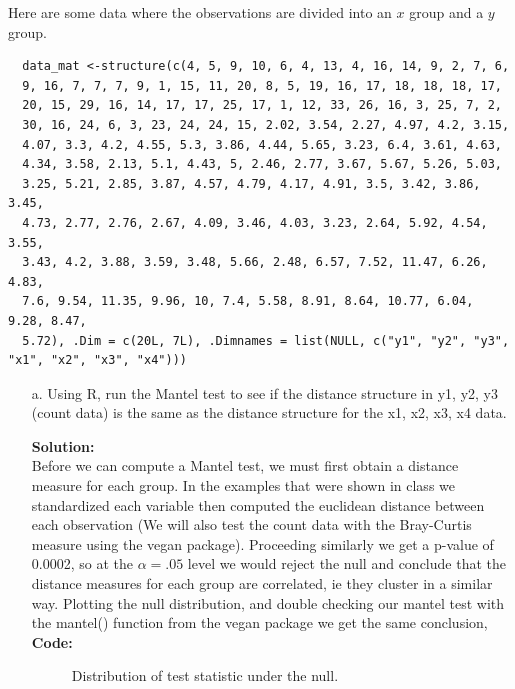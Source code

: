\documentclass[12pt]{article}
\makeatletter
\theoremstyle{homework}
\newenvironment{exercise}[1]
{\def\@currentlabel{#1}\exercisecore}
{\endexercisecore}
\newcommand{\localhead}[1]{\par\smallskip\noindent\textbf{#1}\nobreak\\}%
\newcommand\solution{\localhead{Solution:}}
\makeatother
\begin{document}
\begin{exercise}{1} Here are some data where the observations are divided into an $x$ group and a $y$ group. 
  \begin{footnotesize}
  \begin{verbatim}
  data_mat <-structure(c(4, 5, 9, 10, 6, 4, 13, 4, 16, 14, 9, 2, 7, 6,
  9, 16, 7, 7, 7, 9, 1, 15, 11, 20, 8, 5, 19, 16, 17, 18, 18, 18, 17,
  20, 15, 29, 16, 14, 17, 17, 25, 17, 1, 12, 33, 26, 16, 3, 25, 7, 2,
  30, 16, 24, 6, 3, 23, 24, 24, 15, 2.02, 3.54, 2.27, 4.97, 4.2, 3.15,
  4.07, 3.3, 4.2, 4.55, 5.3, 3.86, 4.44, 5.65, 3.23, 6.4, 3.61, 4.63,
  4.34, 3.58, 2.13, 5.1, 4.43, 5, 2.46, 2.77, 3.67, 5.67, 5.26, 5.03,
  3.25, 5.21, 2.85, 3.87, 4.57, 4.79, 4.17, 4.91, 3.5, 3.42, 3.86, 3.45,
  4.73, 2.77, 2.76, 2.67, 4.09, 3.46, 4.03, 3.23, 2.64, 5.92, 4.54, 3.55,
  3.43, 4.2, 3.88, 3.59, 3.48, 5.66, 2.48, 6.57, 7.52, 11.47, 6.26, 4.83,
  7.6, 9.54, 11.35, 9.96, 10, 7.4, 5.58, 8.91, 8.64, 10.77, 6.04, 9.28, 8.47,
  5.72), .Dim = c(20L, 7L), .Dimnames = list(NULL, c("y1", "y2", "y3", "x1", "x2", "x3", "x4")))
  \end{verbatim}
  \end{footnotesize}
  \begin{enumerate}
    \item[a.] Using R, run the Mantel test to see if the distance structure in y1, y2, y3 (count data) is the same as 
    the distance structure for the x1, x2, x3, x4 data.\\
    \solution Before we can compute a Mantel test, we must first obtain a distance measure for each group. In the examples that were shown in class 
    we standardized each variable then computed the euclidean distance between each observation (We will also test the count data with the Bray-Curtis measure using the vegan package). 
    Proceeding similarly we get a p-value of 0.0002, so at 
    the $\alpha = .05$  level we would reject the null and conclude that the distance measures for each group are correlated, ie they cluster in a similar way. 
    Plotting the null distribution, and double checking our mantel test with the mantel() function from the vegan package we get the same conclusion,\\ 
    \textbf{Code:}
    \begin{center}
    
    \end{center} 
      \begin{figure}[H]
        \begin{center}
          \caption{Distribution of test statistic under the null.}

\end{center}
\end{figure}
\end{enumerate}
\end{exercise}
\end{document}
